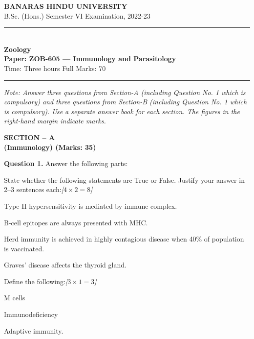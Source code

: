 \documentclass[11pt,a4paper]{article}
\newcommand{\pts}[1]{\hfill   \textit{[#1]}}
\begin{document}
\begin{center}
  {\large\bfseries BANARAS HINDU UNIVERSITY}\\[2pt]
  {\normalsize B.Sc. (Hons.) Semester VI Examination, 2022-23}\\[6pt]
  \rule{0.8\linewidth}{0.5pt}\\[6pt]
  {\large\bfseries Zoology}\\[4pt]
  {\large\bfseries Paper: ZOB-605 --- Immunology and Parasitology}\\[4pt]
  {\normalsize Time: Three hours \hfill Full Marks: 70}
\end{center}

\rule{\linewidth}{0.4pt}

\smallskip



\noindent   \textit{Note: Answer three questions from Section-A (including Question No. 1 which is compulsory) and three questions from Section-B (including Question No. 1 which is compulsory). Use a separate answer book for each section. The figures in the right-hand margin indicate marks.}

\bigskip

\begin{center}
   \textbf{SECTION -- A} \\
   \textbf{(Immunology) (Marks: 35)}
\end{center}




\noindent   \textbf{Question 1.} Answer the following parts:

\begin{parts}
  \item State whether the following statements are True or False. Justify your answer in 2--3 sentences each:\pts{$4  \times 2 = 8$}
  
\begin{parts}
    \item Type II hypersensitivity is mediated by immune complex.
    \item B-cell epitopes are always presented with MHC.
    \item Herd immunity is achieved in highly contagious disease when 40\% of population is vaccinated.
    \item Graves' disease affects the thyroid gland.
  \end{parts}
  
  \item Define the following:\pts{$3  \times 1 = 3$}
  
\begin{parts}
    \item M cells
    \item Immunodeficiency
    \item Adaptive immunity.
  \end{parts}
\end{parts}
\end{document}
